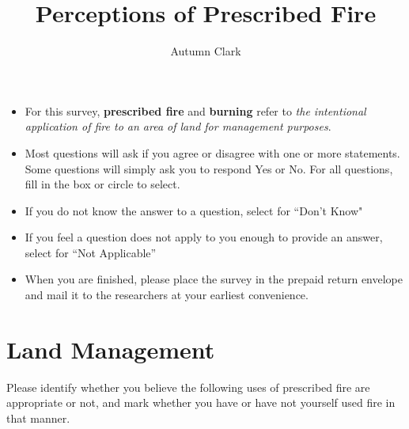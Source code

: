 \documentclass[
  english,
  checkmode = fill,
  ]{sdapsclassic}
\author{Autumn Clark}
\title{Perceptions of Prescribed Fire}
\begin{document}
\begin{sloppypar}
 
  \begin{questionnaire}

    \begin{info}
\begin{itemize}
     \item For this survey, \textbf{prescribed fire} and \textbf{burning} refer to \emph{the intentional application of fire to an area of land for management purposes}.
      \item Most questions will ask if you agree or disagree with one or more statements. 
	     Some questions will simply ask you to respond Yes or No. 
	    For all questions, fill in the box or circle to select. 
      \item If you do not know the answer to a question, select {} for ``Don't Know"
      \item If you feel a question does not apply to you enough to provide an answer, select  for ``Not Applicable''
      \item When you are finished, please place the survey in the prepaid return envelope and mail it to the researchers at your earliest convenience.
\end{itemize}
    \end{info}


    \section{Land Management}

    \begin{choicegroup}[rowsep=0.25em]{Please identify whether you believe the following uses of prescribed fire are appropriate or not, and mark whether you have or have not yourself used fire in that manner.}
      
      
    \end{choicegroup}


\end{questionnaire}
\end{sloppypar}
\end{document}
